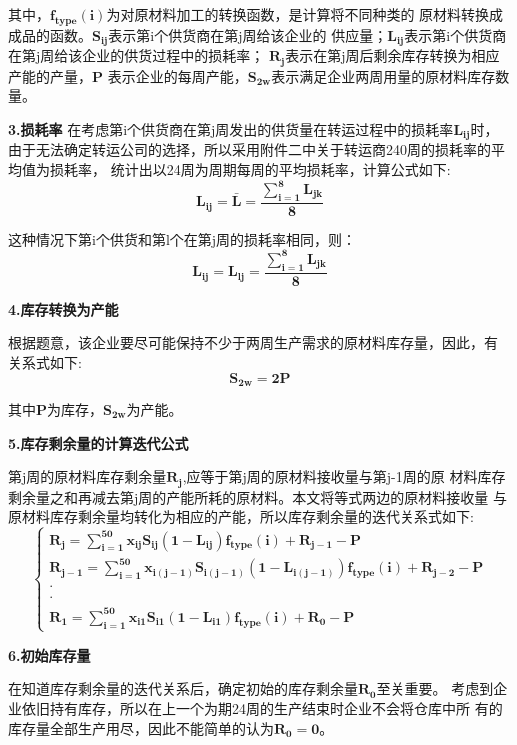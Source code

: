 \documentclass[UTF8]{ctexart}
\begin{document}
其中，$\mathbf{f_{type}(i)}$为对原材料加工的转换函数，是计算将不同种类的
原材料转换成成品的函数。$\mathbf{S_{ij}}$表示第i个供货商在第j周给该企业的
供应量；$\mathbf{L_{ij}}$表示第i个供货商在第j周给该企业的供货过程中的损耗率；
$\mathbf{R_{j}}$表示在第j周后剩余库存转换为相应产能的产量，$\mathbf{P}$
表示企业的每周产能，$\mathbf{S_{2w}}$表示满足企业两周用量的原材料库存数量。

\textbf{3.损耗率}
在考虑第i个供货商在第j周发出的供货量在转运过程中的损耗率$\mathbf{L_{ij}}$时，
由于无法确定转运公司的选择，所以采用附件二中关于转运商240周的损耗率的平均值为损耗率，
统计出以24周为周期每周的平均损耗率，计算公式如下:
\begin{equation}
	\mathbf{L_{ij} =\bar{L} =\frac{\sum_{i=1}^{8}L_{jk} }{8}}
\end{equation}


这种情况下第i个供货和第l个在第j周的损耗率相同，则：
\begin{equation}
	\mathbf{L_{ij} =L_{lj} =\frac{\sum_{i=1}^{8}L_{jk} }{8}}
\end{equation}

\textbf{4.库存转换为产能}

根据题意，该企业要尽可能保持不少于两周生产需求的原材料库存量，因此，有
关系式如下:
\begin{equation}
	\mathbf{S_{2w}=2P}
\end{equation}

其中\textbf{P}为库存，$\mathbf{S_{2w}}$为产能。

\textbf{5.库存剩余量的计算迭代公式}

第j周的原材料库存剩余量$\mathbf{R_{j}}$,应等于第j周的原材料接收量与第j-1周的原
材料库存剩余量之和再减去第j周的产能所耗的原材料。本文将等式两边的原材料接收量
与原材料库存剩余量均转化为相应的产能，所以库存剩余量的迭代关系式如下:
\begin{equation}
	\mathbf{\begin{cases}
		R_{j}=\sum_{i=1}^{50}x_{ij}S_{ij}(1-L_{ij})f_{type}(i)+R_{j-1}-P  \\
		R_{j-1}=\sum_{i=1}^{50}x_{i(j-1)}S_{i(j-1)}(1-L_{i(j-1)})f_{type}(i)+R_{j-2}-P\\
		\cdot  \\
		\cdot  \\
		R_{1}=\sum_{i=1}^{50}x_{i1}S_{i1}(1-L_{i1})f_{type}(i)+R_{0}-P
		\end{cases}}
\end{equation}

\textbf{6.初始库存量}

在知道库存剩余量的迭代关系后，确定初始的库存剩余量$\mathbf{R_{0}}$至关重要。
考虑到企业依旧持有库存，所以在上一个为期24周的生产结束时企业不会将仓库中所
有的库存量全部生产用尽，因此不能简单的认为$\mathbf{R_{0}=0}$。
\end{document}

